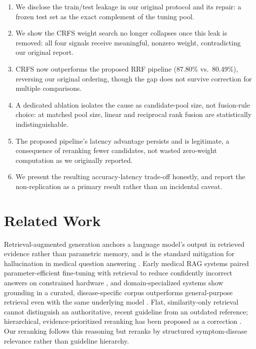 \documentclass[10pt,conference]{IEEEtran}
\begin{document}
\begin{enumerate}
\item We disclose the train/test leakage in our original protocol and its repair: a frozen test set as the exact complement of the tuning pool.
\item We show the CRFS weight search no longer collapses once this leak is removed: all four signals receive meaningful, nonzero weight, contradicting our original report.
\item CRFS now outperforms the proposed RRF pipeline (87.80\% vs.\ 80.49\%), reversing our original ordering, though the gap does not survive correction for multiple comparisons.
\item A dedicated ablation isolates the cause as candidate-pool size, not fusion-rule choice: at matched pool size, linear and reciprocal rank fusion are statistically indistinguishable.
\item The proposed pipeline's latency advantage persists and is legitimate, a consequence of reranking fewer candidates, not wasted zero-weight computation as we originally reported.
\item We present the resulting accuracy-latency trade-off honestly, and report the non-replication as a primary result rather than an incidental caveat.
\end{enumerate}

\section{Related Work}

Retrieval-augmented generation anchors a language model's output in retrieved evidence rather than parametric memory, and is the standard mitigation for hallucination in medical question answering \cite{lewis2020rag}. Early medical RAG systems paired parameter-efficient fine-tuning with retrieval to reduce confidently incorrect answers on constrained hardware \cite{bora2024}, and domain-specialized systems show grounding in a curated, disease-specific corpus outperforms general-purpose retrieval even with the same underlying model \cite{shin2025}. Flat, similarity-only retrieval cannot distinguish an authoritative, recent guideline from an outdated reference; hierarchical, evidence-prioritized reranking has been proposed as a correction \cite{lachenmayer2026}. Our reranking follows this reasoning but reranks by structured symptom-disease relevance rather than guideline hierarchy.
\end{document}
